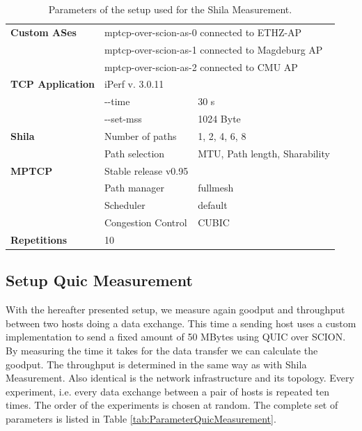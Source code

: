 \begin{table} [H]
	\centering
	\begin{tabular}{lll} 
		\toprule
		\textbf{Custom ASes} 		& \multicolumn{2}{l}{mptcp-over-scion-as-0 connected to ETHZ-AP}				\\
							 		& \multicolumn{2}{l}{mptcp-over-scion-as-1 connected to Magdeburg AP}			\\
							 		& \multicolumn{2}{l}{mptcp-over-scion-as-2 connected to CMU AP}					\smallskip \\ 
		\textbf{TCP Application}	& iPerf v. 3.0.11								&								\\
									& -\vspace{0 px}-time										& 30 s				\\
									& -\vspace{0 px}-set-mss										& 1024 Byte		\smallskip	\\
		\textbf{Shila}				&  Number of paths								& 1, 2, 4, 6, 8					\\
									& Path selection				 				& MTU, Path length, Sharability \smallskip\\
		\textbf{MPTCP}				& Stable release v0.95							&								\\
									& Path manager									& fullmesh						\\
									& Scheduler										& default						\\
									& Congestion Control							& CUBIC							\smallskip\\
		\textbf{Repetitions} 		& 10  											&								\\
		\bottomrule
	\end{tabular}
	\label{tab:ParameterShilaMeasurement}
	\caption{Parameters of the setup used for the Shila Measurement.}
\end{table}

\subsection*{Setup Quic Measurement}

With the hereafter presented setup, we measure again goodput and throughput between two hosts doing a data exchange. This time a sending host uses a custom implementation to send a fixed amount of 50 MBytes using QUIC over SCION. By measuring the time it takes for the data transfer we can calculate the goodput. The throughput is determined in the same way as with Shila Measurement. Also identical is the network infrastructure and its topology. Every experiment, i.e. every data exchange between a pair of hosts is repeated ten times. The order of the experiments is chosen at random. The complete set of parameters is listed in Table \ref{tab:ParameterQuicMeasurement}.

